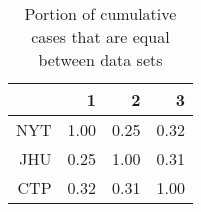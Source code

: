 \begin{table}[ht]
\centering
\begin{tabular}{rrrr}
  \hline
 & 1 & 2 & 3 \\ 
  \hline
NYT & 1.00 & 0.25 & 0.32 \\ 
  JHU & 0.25 & 1.00 & 0.31 \\ 
  CTP & 0.32 & 0.31 & 1.00 \\ 
   \hline
\end{tabular}
\caption{Portion of cumulative cases that are equal between data sets\label{tab:casediff}} 
\end{table}
